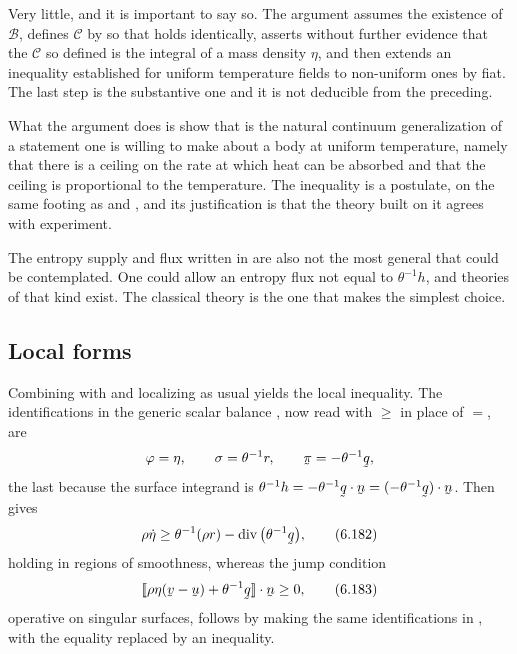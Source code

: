 \begin{remark}\label{rem:ch6truesdell}
Very little, and it is important to say so. The argument assumes the
existence of $\mathcal{B}$, defines $\mathcal{C}$ by  so
that  holds identically, asserts without further evidence
that the $\mathcal{C}$ so defined is the integral  of a mass
density $\eta$, and then extends an inequality established for uniform
temperature fields to non-uniform ones by fiat. The last step is the
substantive one and it is not deducible from the preceding.

What the argument does is show that  is the natural
continuum generalization of a statement one is willing to make about a
body at uniform temperature, namely that there is a ceiling on the rate
at which heat can be absorbed and that the ceiling is proportional to
the temperature. The inequality is a postulate, on the same footing as
 and , and its justification is that the theory
built on it agrees with experiment.

The entropy supply and flux written in  are also not the
most general that could be contemplated. One could allow an entropy
flux not equal to $\theta^{-1}h$, and theories of that kind exist. The
classical theory is the one that makes the simplest choice.
\end{remark}

\subsection*{Local forms}

Combining  with  and localizing as usual yields
the local inequality. The identifications in the generic scalar balance
, now read with $\geq$ in place of $=$, are
\[
   \varphi=\eta,\qquad \sigma=\theta^{-1}r,\qquad
   \vek\pi=-\theta^{-1}\bq ,
\]
the last because the surface integrand is
$\theta^{-1}h=-\theta^{-1}\ip\bq\bn=\ip{(-\theta^{-1}\bq)}\bn$. Then
 gives
\begin{equation}
   \rho\dot\eta\geq\theta^{-1}(\rho r)-\dvg\big(\theta^{-1}\bq\big),
   \tag{6.182}\label{eq:6.182}
\end{equation}
holding in regions of smoothness, whereas the jump condition
\begin{equation}
   \ip{\jump{\rho\eta(\bv-\bu)+\theta^{-1}\bq}}\bn\geq0 ,
   \tag{6.183}\label{eq:6.183}
\end{equation}
operative on singular surfaces, follows by making the same
identifications in , with the equality replaced by an
inequality.


